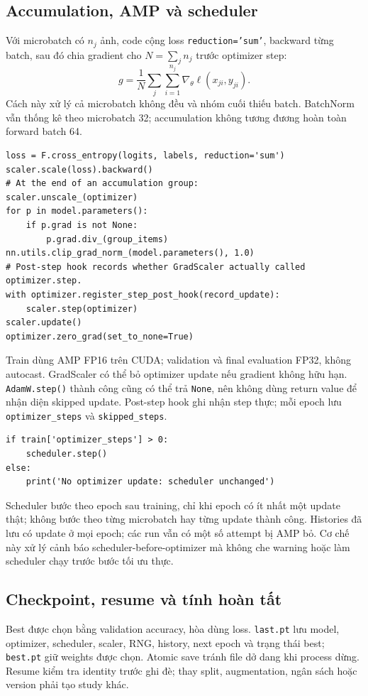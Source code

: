 \documentclass[11pt,a4paper]{article}
\begin{document}
\subsection{Accumulation, AMP và scheduler}
Với microbatch có $n_j$ ảnh, code cộng loss \texttt{reduction='sum'}, backward từng batch, sau đó chia gradient cho $N=\sum_jn_j$ trước optimizer step:
\begin{equation}
g=\frac 1 N\sum_j\sum_{i=1}^{n_j}\nabla_\theta\ell(x_{ji},y_{ji}).
\end{equation}
Cách này xử lý cả microbatch không đều và nhóm cuối thiếu batch. BatchNorm vẫn thống kê theo microbatch 32; accumulation không tương đương hoàn toàn forward batch 64.
\begin{lstlisting}
loss = F.cross_entropy(logits, labels, reduction='sum')
scaler.scale(loss).backward()
# At the end of an accumulation group:
scaler.unscale_(optimizer)
for p in model.parameters():
    if p.grad is not None:
        p.grad.div_(group_items)
nn.utils.clip_grad_norm_(model.parameters(), 1.0)
# Post-step hook records whether GradScaler actually called optimizer.step.
with optimizer.register_step_post_hook(record_update):
    scaler.step(optimizer)
scaler.update()
optimizer.zero_grad(set_to_none=True)
\end{lstlisting}
Train dùng AMP FP16 trên CUDA; validation và final evaluation FP32, không autocast. GradScaler có thể bỏ optimizer update nếu gradient không hữu hạn. \texttt{AdamW.step()} thành công cũng có thể trả \texttt{None}, nên không dùng return value để nhận diện skipped update. Post-step hook ghi nhận step thực; mỗi epoch lưu \texttt{optimizer\_steps} và \texttt{skipped\_steps}.
\begin{lstlisting}
if train['optimizer_steps'] > 0:
    scheduler.step()
else:
    print('No optimizer update: scheduler unchanged')
\end{lstlisting}
Scheduler bước theo epoch sau training, chỉ khi epoch có ít nhất một update thật; không bước theo từng microbatch hay từng update thành công. Histories đã lưu có update ở mọi epoch; các run vẫn có một số attempt bị AMP bỏ. Cơ chế này xử lý cảnh báo scheduler-before-optimizer mà không che warning hoặc làm scheduler chạy trước bước tối ưu thực.
\clearpage

\subsection{Checkpoint, resume và tính hoàn tất}
Best được chọn bằng validation accuracy, hòa dùng loss. \texttt{last.pt} lưu model, optimizer, scheduler, scaler, RNG, history, next epoch và trạng thái best; \texttt{best.pt} giữ weights được chọn. Atomic save tránh file dở dang khi process dừng. Resume kiểm tra identity trước ghi đè; thay split, augmentation, ngân sách hoặc version phải tạo study khác.
\end{document}
